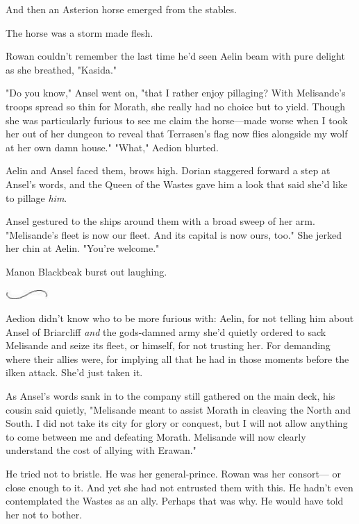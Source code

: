 And then an Asterion horse emerged from the stables.

The horse was a storm made flesh.

Rowan couldn't remember the last time he'd seen Aelin beam with pure delight as she breathed, "Kasida."

"Do you know," Ansel went on, "that I rather enjoy pillaging?
With Melisande's troops spread so thin for Morath, she really had no choice but to yield.
Though she was particularly furious to see me claim the horse---made worse when I took her out of her dungeon to reveal that Terrasen's flag now flies alongside my wolf at her own damn house."
"What," Aedion blurted.

Aelin and Ansel faced them, brows high.
Dorian staggered forward a step at Ansel's words, and the Queen of the Wastes gave him a look that said she'd like to pillage \emph{him}.

Ansel gestured to the ships around them with a broad sweep of her arm.
"Melisande's fleet is now our fleet.
And its capital is now ours, too."
She jerked her chin at Aelin.
"You're welcome."

Manon Blackbeak burst out laughing.

\begin{center}
	\includegraphics[width=0.65in,height=0.13in]{images/seperator}
\end{center}

Aedion didn't know who to be more furious with: Aelin, for not telling him about Ansel of Briarcliff \emph{and} the gods-damned army she'd quietly ordered to sack Melisande and seize its fleet, or himself, for not trusting her.
For demanding where their allies were, for implying all that he had in those moments before the ilken attack.
She'd just taken it.

As Ansel's words sank in to the company still gathered on the main deck, his cousin said quietly, "Melisande meant to assist Morath in cleaving the North and South.
I did not take its city for glory or conquest, but I will not allow anything to come between me and defeating Morath.
Melisande will now clearly understand the cost of allying with Erawan."

He tried not to bristle.
He was her general-prince.
Rowan was her consort--- or close enough to it.
And yet she had not entrusted them with this.
He hadn't even contemplated the Wastes as an ally.
Perhaps that was why.
He would have told her not to bother.

